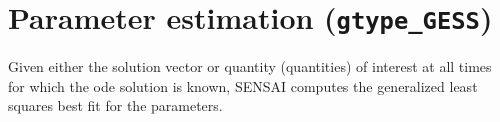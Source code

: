 \documentclass{siamltex}
\newcommand{\Fmat}{\bm{F}}
\newcommand{\Mmat}{\bm{M}}
\newcommand{\Fdim}{{\tt Fdim}}
\newcommand{\ntsteps}{{\tt ntsteps}}
\begin{document}
%

\section{Parameter estimation ({\tt gtype\_GESS})}
Given either the solution vector or quantity (quantities) of interest at all times for which the ode solution is known, SENSAI computes the generalized least squares best fit for the parameters.


%
%
%
%
%
%
%
%
\end{document}
